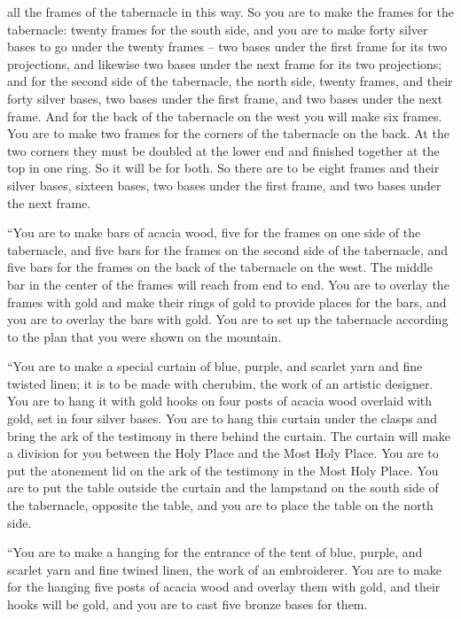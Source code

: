 {all
the frames
of the tabernacle
in this way.
So you are to make
the frames
for the tabernacle: twenty
frames
for the south
side,
and you are to make
forty
silver
bases
to go under
the twenty
frames
– two
bases
under
the first
frame
for its two
projections,
and likewise two
bases
under
the next
frame
for its two
projections;
and for the second
side
of the tabernacle,
the north
side,
twenty
frames,
and their forty
silver
bases,
two
bases
under
the first frame,
and two
bases
under
the next frame.
And for the back
of the tabernacle
on the west
you will make
six
frames.
You are
to make two
frames
for the corners
of the tabernacle
on the back.
At the two
corners
they must be
doubled
at the lower
end and finished together
at the top
in one
ring.
So
it will be
for both.
So there are to be
eight
frames
and their silver
bases,
sixteen
bases,
two
bases
under
the first
frame,
and two
bases
under
the next
frame.
\par }{\PP {}“You are to make
bars
of acacia
wood,
five
for the frames
on one
side
of the tabernacle,
and five
bars
for the frames
on the second
side
of the tabernacle,
and five
bars
for the frames
on the back
of the tabernacle
on the west.
The middle
bar
in the center
of the frames
will reach
from
end
to
end.
You are to overlay
the
frames
with gold
and make
their rings
of gold
to provide
places for the bars,
and you are to overlay
the
bars
with gold.
You are to set
up the
tabernacle
according
to the plan that
you were shown
on the mountain.
\par }{\PP {}“You are to make
a special curtain
of blue,
purple,
and scarlet
yarn
and fine
twisted
linen;
it is to be made
with cherubim,
the work
of an artistic designer.
You are to hang
it with gold
hooks
on
four
posts
of acacia
wood overlaid
with gold,
set in
four
silver
bases.
You are to hang
this curtain
under
the clasps
and bring
the ark
of the testimony
in there
behind the curtain.
The curtain
will make a division
for you between
the Holy Place
and the Most Holy Place.
You are to put
the atonement lid
on
the ark
of the testimony
in the Most
Holy Place.
You are to put
the
table
outside
the curtain
and the
lampstand
on
the south
side
of the tabernacle,
opposite
the table,
and you are to place
the table
on
the north
side.
\par }{\PP {}“You are to make
a hanging
for the entrance
of the tent
of blue,
purple,
and scarlet
yarn
and fine
twined
linen,
the work
of an embroiderer.
You are to make
for the hanging
five
posts
of acacia wood
and overlay
them with gold,
and their hooks
will be gold,
and you are to cast
five
bronze
bases for them.


}
